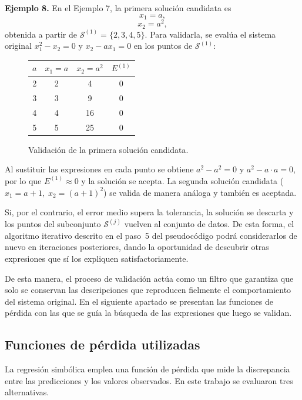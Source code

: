 \bigskip \noindent\textbf{Ejemplo 8.} En el Ejemplo 7, la primera solución candidata es
\[
x_1 = a,
\]
\[
x_2 = a^2,
\]
obtenida a partir de \(\mathcal{S}^{(1)} = \{2, 3, 4, 5\}\). Para validarla, se evalúa el sistema original
\(x_1^2 - x_2 = 0\) y \(x_2 - a x_1 = 0\) en los puntos de
\(\mathcal{S}^{(1)}\):

\begin{figure}[H]
\centering
\begin{tabular}{c|c|c|c}
\(a\) & \(x_1 = a\) & \(x_2 = a^2\) & \(E^{(1)}\) \\
\hline 2 & 2 & 4 & 0 \\
3 & 3 & 9 & 0 \\
4 & 4 & 16 & 0 \\
5 & 5 & 25 & 0
\end{tabular}
\caption{Validación de la primera solución candidata.} \label{fig:validacion_ejemplo8}
\end{figure}

Al sustituir las expresiones en cada punto se obtiene
\(a^2 - a^2 = 0\) y \(a^2 - a \cdot a = 0\), por lo que
\(E^{(1)} \approx 0\) y la solución se acepta. La segunda solución
candidata (\(x_1 = a + 1,\; x_2 = (a+1)^2\)) se valida de manera análoga y también es aceptada.

Si, por el contrario, el error medio supera la tolerancia, la solución se descarta y los puntos del subconjunto \(\mathcal{S}^{(j)}\) vuelven al conjunto de datos. De esta forma, el algoritmo iterativo descrito en el paso~5 del pseudocódigo podrá considerarlos de nuevo en iteraciones posteriores, dando la oportunidad de descubrir otras expresiones que sí los expliquen satisfactoriamente.

De esta manera, el proceso de validación actúa como un filtro que garantiza que solo se conservan las descripciones que reproducen fielmente el comportamiento del sistema original. En el siguiente apartado se presentan las funciones de pérdida con las que se guía la búsqueda de las expresiones que luego se validan.
\subsection{Funciones de pérdida utilizadas} \label{sec:funciones_perdida}

La regresión simbólica emplea una función de pérdida que mide la discrepancia entre las predicciones y los valores observados. En este trabajo se evaluaron tres alternativas.

